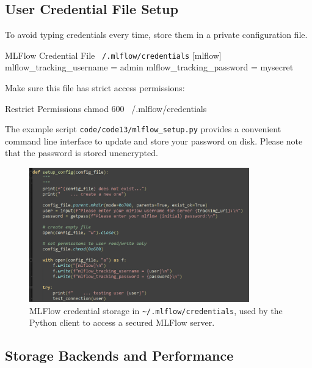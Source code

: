 \subsection{User Credential File Setup}

To avoid typing credentials every time, store them in a private configuration file.

\begin{codeonly}{MLFlow Credential File \texttt{~/.mlflow/credentials}}
[mlflow]
mlflow_tracking_username = admin
mlflow_tracking_password = mysecret
\end{codeonly}

Make sure this file has strict access permissions:

\begin{codeonly}{Restrict Permissions}
chmod 600 ~/.mlflow/credentials
\end{codeonly}

The example script \texttt{code/code13/mlflow\_setup.py} provides a convenient command line interface to update and store your password on disk.
Please note that the password is stored unencrypted.

\begin{figure}[htbp]
    \centering
    \includegraphics[width=0.85\textwidth]{images/mlflow_credentials.png}
    \caption{MLFlow credential storage in \texttt{\textasciitilde/.mlflow/credentials}, used by the Python client to access a secured MLFlow server.}
    \label{fig:mlflow_credentials}
\end{figure}

%
\subsection{Storage Backends and Performance}


